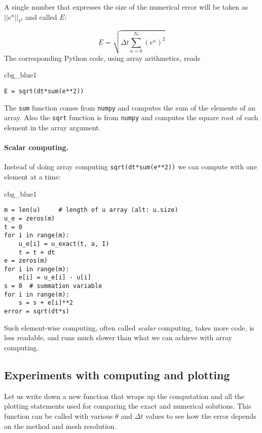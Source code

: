 \documentclass[graybox,sectrefs,envcountresetchap,open=right,final]{svmonodo}
\newenvironment{_cod_tight}[1]{
   \def\FrameCommand{\colorbox{#1}}
   \FrameRule0.6pt\MakeFramed {\FrameRestore}\vskip3mm}
   {\vskip0mm\endMakeFramed}
\newenvironment{cod}[1]{
\bgroup\rmfamily
\fboxsep=0mm\relax
\begin{_cod_tight}{#1}
\list{}{\parsep=-2mm\parskip=0mm\topsep=0pt\leftmargin=2mm
\rightmargin=2\leftmargin\leftmargin=4pt\relax}
\item\relax}
{\endlist\end{_cod_tight}\egroup}
\begin{document}

A single number that expresses the size of the numerical error
will be taken as $||e^n||_{\ell^2}$ and called $E$:

\begin{equation}
E = \sqrt{\Delta t\sum_{n=0}^{N_t} (e^n)^2}
\label{decay:E}
\end{equation}
The corresponding Python code, using array arithmetics, reads

\begin{cod}{cbg_blue1}\begin{Verbatim}[numbers=none,fontsize=\fontsize{9pt}{9pt},baselinestretch=0.95,xleftmargin=2mm]
E = sqrt(dt*sum(e**2))
\end{Verbatim}
\end{cod}
\noindent
The \texttt{sum} function comes from \texttt{numpy} and computes the sum of the elements
of an array. Also the \texttt{sqrt} function is from \texttt{numpy} and computes the
square root of each element in the array argument.


\paragraph{Scalar computing.}
Instead of doing array computing \texttt{sqrt(dt*sum(e**2))} we can compute with
one element at a time:
\begin{cod}{cbg_blue1}\begin{Verbatim}[numbers=none,fontsize=\fontsize{9pt}{9pt},baselinestretch=0.95,xleftmargin=2mm]
m = len(u)     # length of u array (alt: u.size)
u_e = zeros(m)
t = 0
for i in range(m):
    u_e[i] = u_exact(t, a, I)
    t = t + dt
e = zeros(m)
for i in range(m):
    e[i] = u_e[i] - u[i]
s = 0  # summation variable
for i in range(m):
    s = s + e[i]**2
error = sqrt(dt*s)
\end{Verbatim}
\end{cod}
\noindent
Such element-wise computing, often called \emph{scalar} computing, takes
more code, is less readable, and runs much slower than what we
can achieve with array computing.





\subsection{Experiments with computing and plotting}


Let us write down a new function that wraps up the computation and all
the plotting statements used for comparing the exact and numerical
solutions. This function can be called with various $\theta$ and
$\Delta t$ values to see how the error depends on the method and mesh
resolution.
\end{document}
